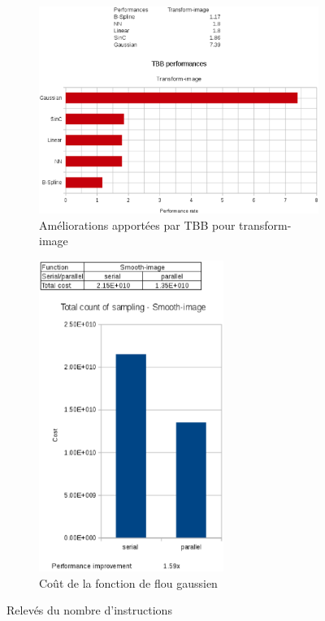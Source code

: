 \documentclass[10pt]{report}
\begin{document}
\begin{figure}[h!]
	\centering
	\begin{subfigure}{.5\textwidth}
		\centering
		\includegraphics[width=10cm]{Reports/figures/performances_tbb_transform_image.eps}
		\caption{Améliorations apportées par TBB pour transform-image}
		\label{Améliorations apportées par TBB pour transform-image}
		\vspace{0.1cm}
	\end{subfigure}
	\begin{subfigure}{.5\textwidth}
		\centering
		\includegraphics[width=6cm]{Reports/figures/smooth_image_costs.eps}
		\caption{Coût de la fonction de flou gaussien}
		\label{Coût de la fonction de flou gaussien}
	\end{subfigure}
	\caption{Relevés du nombre d'instructions}
	\label{Relevés du nombre d'instructions}
\end{figure}
\end{document}
